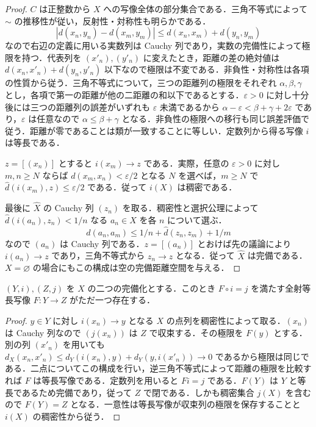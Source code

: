 \begin{proof}
$C$ は正整数から $X$ への写像全体の部分集合である．三角不等式によって $\sim$ の推移性が従い，反射性・対称性も明らかである．
\[
 |d(x_n,y_n)-d(x_m,y_m)|\leq d(x_n,x_m)+d(y_n,y_m)
\]
なので右辺の定義に用いる実数列は Cauchy 列であり，実数の完備性によって極限を持つ．代表列を $(x'_n),(y'_n)$ に変えたとき，距離の差の絶対値は $d(x_n,x'_n)+d(y_n,y'_n)$ 以下なので極限は不変である．非負性・対称性は各項の性質から従う．三角不等式について，三つの距離列の極限をそれぞれ $\alpha,\beta,\gamma$ とし，各項で第一の距離が他の二距離の和以下であるとする．$\varepsilon>0$ に対し十分後には三つの距離列の誤差がいずれも $\varepsilon$ 未満であるから $\alpha-\varepsilon<\beta+\gamma+2\varepsilon$ であり，$\varepsilon$ は任意なので $\alpha\leq\beta+\gamma$ となる．非負性の極限への移行も同じ誤差評価で従う．距離が零であることは類が一致することに等しい．定数列から得る写像 $i$ は等長である．

$z=[(x_n)]$ とすると $i(x_m)\to z$ である．実際，任意の $\varepsilon>0$ に対し $m,n\geq N$ ならば $d(x_m,x_n)<\varepsilon/2$ となる $N$ を選べば，$m\geq N$ で $\widehat d(i(x_m),z)\leq\varepsilon/2$ である．従って $i(X)$ は稠密である．

最後に $\widehat X$ の Cauchy 列 $(z_n)$ を取る．稠密性と選択公理によって $\widehat d(i(a_n),z_n)<1/n$ なる $a_n\in X$ を各 $n$ について選ぶ．
\[
 d(a_n,a_m)\leq 1/n+\widehat d(z_n,z_m)+1/m
\]
なので $(a_n)$ は Cauchy 列である．$z=[(a_n)]$ とおけば先の議論により $i(a_n)\to z$ であり，三角不等式から $z_n\to z$ となる．従って $\widehat X$ は完備である．$X=\varnothing$ の場合にもこの構成は空の完備距離空間を与える．
\end{proof}
\begin{prop}[距離完備化の一意性]
$(Y,i),(Z,j)$ を $X$ の二つの完備化とする．このとき $F\circ i=j$ を満たす全射等長写像 $F:Y\to Z$ がただ一つ存在する．
\end{prop}
\begin{proof}
$y\in Y$ に対し $i(x_n)\to y$ となる $X$ の点列を稠密性によって取る．$(x_n)$ は Cauchy 列なので $(j(x_n))$ は $Z$ で収束する．その極限を $F(y)$ とする．別の列 $(x'_n)$ を用いても $d_X(x_n,x'_n)\leq d_Y(i(x_n),y)+d_Y(y,i(x'_n))\to0$ であるから極限は同じである．二点についてこの構成を行い，逆三角不等式によって距離の極限を比較すれば $F$ は等長写像である．定数列を用いると $Fi=j$ である．$F(Y)$ は $Y$ と等長であるため完備であり，従って $Z$ で閉である．しかも稠密集合 $j(X)$ を含むので $F(Y)=Z$ となる．一意性は等長写像が収束列の極限を保存することと $i(X)$ の稠密性から従う．
\end{proof}
